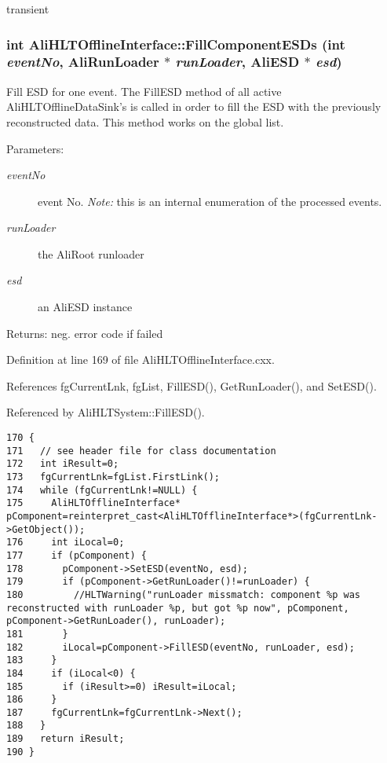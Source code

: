 transient 

\subsubsection{\setlength{\rightskip}{0pt plus 5cm}int Ali\-HLTOffline\-Interface::Fill\-Component\-ESDs (int {\em event\-No}, Ali\-Run\-Loader $\ast$ {\em run\-Loader}, Ali\-ESD $\ast$ {\em esd})\hspace{0.3cm}{\tt  [static]}}\label{classAliHLTOfflineInterface_e1}


Fill ESD for one event. The Fill\-ESD method of all active Ali\-HLTOffline\-Data\-Sink's is called in order to fill the ESD with the previously reconstructed data. This method works on the global list. \begin{Desc}
\item[Parameters:]
\begin{description}
\item[{\em event\-No}]event No. {\em Note:\/} this is an internal enumeration of the processed events. \item[{\em run\-Loader}]the Ali\-Root runloader \item[{\em esd}]an Ali\-ESD instance \end{description}
\end{Desc}
\begin{Desc}
\item[Returns:]neg. error code if failed \end{Desc}


Definition at line 169 of file Ali\-HLTOffline\-Interface.cxx.

References fg\-Current\-Lnk, fg\-List, Fill\-ESD(), Get\-Run\-Loader(), and Set\-ESD().

Referenced by Ali\-HLTSystem::Fill\-ESD().

\footnotesize\begin{verbatim}170 {
171   // see header file for class documentation
172   int iResult=0;
173   fgCurrentLnk=fgList.FirstLink();
174   while (fgCurrentLnk!=NULL) {
175     AliHLTOfflineInterface* pComponent=reinterpret_cast<AliHLTOfflineInterface*>(fgCurrentLnk->GetObject());
176     int iLocal=0;
177     if (pComponent) {
178       pComponent->SetESD(eventNo, esd);
179       if (pComponent->GetRunLoader()!=runLoader) {
180         //HLTWarning("runLoader missmatch: component %p was reconstructed with runLoader %p, but got %p now", pComponent, pComponent->GetRunLoader(), runLoader);
181       }
182       iLocal=pComponent->FillESD(eventNo, runLoader, esd);
183     }
184     if (iLocal<0) {
185       if (iResult>=0) iResult=iLocal;
186     }
187     fgCurrentLnk=fgCurrentLnk->Next();
188   }
189   return iResult;
190 }
\end{verbatim}\normalsize 


